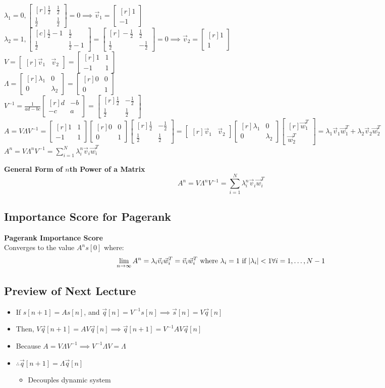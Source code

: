 \documentclass{article}\usepackage{amsmath,amssymb,amsthm,tikz,tkz-graph,color,chngpage,soul,hyperref,csquotes,graphicx,floatrow,framed,scrextend,mathtools,mathrsfs,setspace}\newcommand*{\QEDB}{\hfill\ensuremath{\square}}\newtheorem*{prop}{Proposition}\renewcommand{\theenumi}{\alph{enumi}}\usepackage[shortlabels]{enumitem}\usepackage[nobreak=true]{mdframed}\usetikzlibrary{matrix,calc}\MakeOuterQuote{"}\usepackage[margin=0.75in]{geometry} \newtheorem{theorem}{Theorem}\newcommand{\Z}{\mathbb Z}\newcommand{\R}{\mathbb R}\newcommand{\Q}{\mathbb Q}\newcommand{\N}{\mathbb N}\newcommand{\x}[1]{\textrm{#1}}\newcommand{\xs}[1]{\textrm{ #1 }}\newcommand{\pr}{\textrm{Pr}}
\newcommand{\sumlim}[3]{\sum\limits_{#1}^{#2}#3}
\newcommand{\eq}[1]{\begin{equation}#1\end{equation}}
\newcommand{\eqs}[1]{\begin{mdframed}#1\end{mdframed}}
\DeclarePairedDelimiter{\abs}{\lvert}{\rvert}
\newcommand{\items}[1]{\begin{itemize}#1\end{itemize}}
\newcommand{\bmat}[1]{\begin{bmatrix*}[r]#1\end{bmatrix*}}
\newcommand{\bmatc}[1]{\begin{bmatrix*}[c]#1\end{bmatrix*}}
\newcommand{\la}{\lambda}
\newcommand{\La}{\Lambda}
\newcommand{\limty}{\lim_{n\rightarrow\infty}}
\begin{document}
{$\la_1=0, \bmat{\frac{1}{2}&\frac{1}{2}\\\frac{1}{2}&\frac{1}{2}}=0\implies \vec{v}_1=\bmat{1\\-1}$\\
$\la_2=1, \bmatc{\frac{1}{2}-1&\frac{1}{2}\\\frac{1}{2}&\frac{1}{2}-1}=\bmat{-\frac{1}{2}&\frac{1}{2}\\\frac{1}{2}&-\frac{1}{2}}=0 \implies \vec{v}_2=\bmat{1\\1}$\\
$V=\bmat{\vec{v}_1&\vec{v}_2}=\bmat{1&1\\-1&1}$\\
$\La=\bmat{\la_1&0\\0&\la_2}=\bmat{0&0\\0&1}$\\
$V^{-1}=\frac{1}{ad-bc}\bmat{d&-b\\-c&a}=\bmat{\frac{1}{2}&-\frac{1}{2}\\\frac{1}{2}&\frac{1}{2}}$\\
$A=V\La V^{-1}=\bmat{1&1\\-1&1}\bmat{0&0\\0&1}\bmat{\frac{1}{2}&-\frac{1}{2}\\\frac{1}{2}&\frac{1}{2}}=\bmat{\vec{v}_1&\vec{v}_2}\bmat{\la_1&0\\0&\la_2}\bmat{\vec{w}_1^T\\\vec{w}_2^T}=\la_1\vec{v}_1\vec{w}_1^T+\la_2\vec{v}_2\vec{w}_2^T$\\
$A^n=V\La^nV^{-1}=\sumlim{i=1}{N}{\la_i^n\vec{v}_i\vec{w}_i^T}$
}
\eqs{
\textbf{General Form of $n$th Power of a Matrix}
\eq{A^n=V\La^nV^{-1}=\sumlim{i=1}{N}{\la_i^n\vec{v}_i\vec{w}_i^T}}
}
\subsection*{Importance Score for Pagerank}
\eqs{
\textbf{Pagerank Importance Score}\\
Converges to the value $A^ns[0]$ where:
\eq{\limty A^n=\la_i\vec{v}_i\vec{w}_i^T=\vec{v}_i\vec{w}_i^T\xs{where}\la_i=1\xs{if}\abs{\la_i}<1\forall i=1,\ldots,N-1}
}
\subsection*{Preview of Next Lecture}
\items{
    \item If $s[n+1]=As[n]$, and $\vec{q}[n]=V^{-1}s[n]\implies \vec{s}[n]=V\vec{q}[n]$
    \item Then, $V\vec{q}[n+1]=A V\vec{q}[n]\implies\vec{q}[n+1]=V^{-1}A V\vec{q}[n]$
    \item Because $A=V\La V^{-1}\implies V^{-1}\La V=\La$
    \item $\therefore \vec{q}[n+1]=\La\vec{q}[n]$
    \items{
        \item Decouples dynamic system
    }
}
\end{document}
